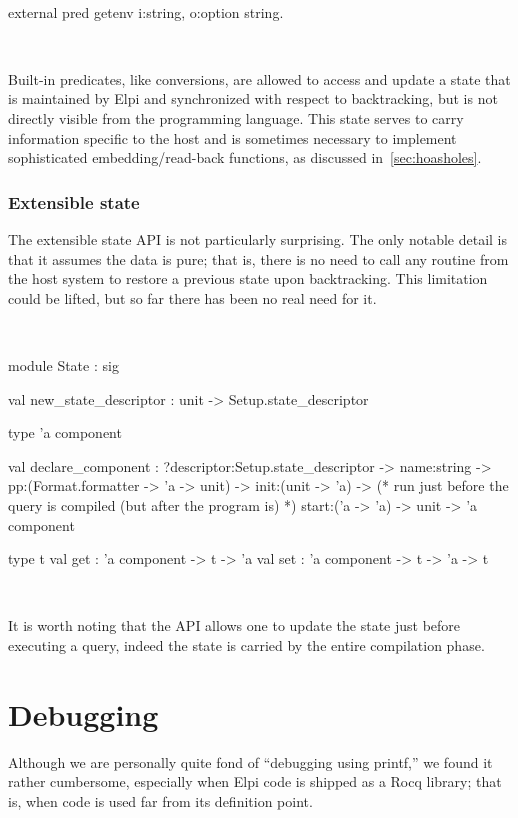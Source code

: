 \documentclass[a4paper, 11pt]{book}
\newenvironment{elpicode}
  {\VerbatimEnvironment~\\\begin{elpibox}\begin{xelpicode}}{\end{xelpicode}
\end{elpibox}\\}
\newenvironment{ocamlcode}
  {\VerbatimEnvironment~\\\begin{ocamlbox}\begin{xocamlcode}}{\end{xocamlcode}
\end{ocamlbox}\\}
\begin{document}
\begin{elpicode}
external pred getenv i:string, o:option string.
\end{elpicode}

Built-in predicates, like conversions, are allowed to access and update a
state that is maintained by Elpi and synchronized with respect to
backtracking, but is not directly visible from the programming language. This
state serves to carry information specific to the host and is sometimes necessary to
implement sophisticated embedding/read-back functions, as discussed
in~\cref{sec:hoasholes}.

\subsubsection{Extensible state}\label{sec:state}

The extensible state API is not particularly surprising. The only notable
detail is that it assumes the data is pure; that is, there is no need to call
any routine from the host system to restore a previous state upon
backtracking. This limitation could be lifted, but so far there has been no
real need for it.

\begin{ocamlcode}
module State : sig

  val new_state_descriptor : unit -> Setup.state_descriptor

  type 'a component

  val declare_component :
    ?descriptor:Setup.state_descriptor ->
    name:string ->
    pp:(Format.formatter -> 'a -> unit) ->
    init:(unit -> 'a) ->
    (* run just before the query is compiled (but after the program is) *)
    start:('a -> 'a) ->
    unit ->
      'a component

  type t
  val get : 'a component -> t -> 'a
  val set : 'a component -> t -> 'a -> t
\end{ocamlcode}

\noindent
It is worth noting that the API allows one to update the state just before
executing a query, indeed the state is carried by the entire compilation
phase.

\section{Debugging}\label{sec:trace}


Although we are personally quite fond of ``debugging using printf,'' we found
it rather cumbersome, especially when Elpi code is shipped as a Rocq library;
that is, when code is used far from its definition point.
\end{document}
